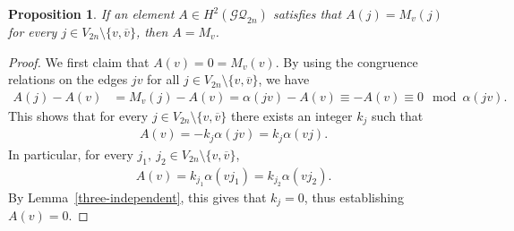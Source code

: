 \documentclass[12pt]{amsart}
\newtheorem{proposition}[theorem]{Proposition}
\theoremstyle{remark}
\numberwithin{equation}{section}
\begin{document}
\begin{proposition}
If an element $A\in H^{2}(\mathcal{GQ}_{2n})$ satisfies that 
$A(j)=M_{v}(j)$ for every $j\in V_{2n}\setminus\{v,\overline{v}\}$, then $A=M_{v}$.
\end{proposition}
\begin{proof}
We first claim that $A(v)=0=M_{v}(v)$.
By using the congruence relations on the edges $jv$ for all $j\in V_{2n}\setminus\{v,\overline{v}\}$, %
we have 
\begin{align*}
A(j)-A(v)&=M_{v}(j)-A(v) 
=\alpha(jv)-A(v)\equiv -A(v) \equiv 0\mod \alpha(jv).
\end{align*}
This shows that for every $j\in V_{2n}\setminus\{v,\overline{v}\}$ %
there exists an integer $k_{j}$ such that 
\begin{align*}
A(v)=-k_{j}\alpha(jv)=k_{j}\alpha(vj). %
\end{align*}
In particular, for every $j_{1},\ j_{2} \in V_{2n}\setminus \{v,\overline{v}\}$, 
\begin{align*}
A(v)=k_{j_{1}}\alpha(vj_{1})=k_{j_{2}}\alpha(vj_{2}). %
\end{align*}
By Lemma~\ref{three-independent},  
this gives that $k_{j}=0$, %
thus establishing $A(v)=0$.


\end{proof}
\end{document}
